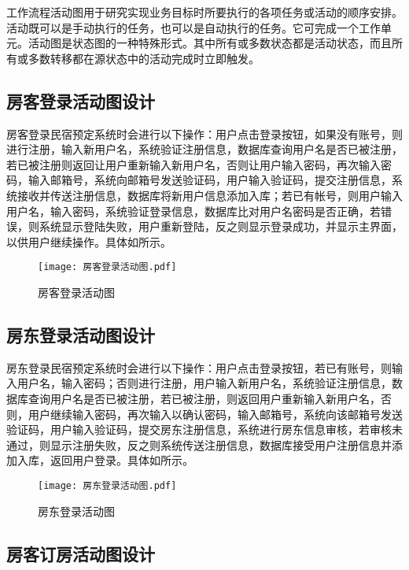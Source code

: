 \documentclass[lang=cn,11pt,a4paper,cite=authoryear]{elegantpaper}
\begin{document}
工作流程活动图用于研究实现业务目标时所要执行的各项任务或活动的顺序安排。活动既可以是手动执行的任务，也可以是自动执行的任务。它可完成一个工作单元。活动图是状态图的一种特殊形式。其中所有或多数状态都是活动状态，而且所有或多数转移都在源状态中的活动完成时立即触发。

\subsection{房客登录活动图设计}

房客登录民宿预定系统时会进行以下操作：用户点击登录按钮，如果没有账号，则进行注册，输入新用户名，系统验证注册信息，数据库查询用户名是否已被注册，若已被注册则返回让用户重新输入新用户名，否则让用户输入密码，再次输入密码，输入邮箱号，系统向邮箱号发送验证码，用户输入验证码，提交注册信息，系统接收并传送注册信息，数据库将新用户信息添加入库；若已有帐号，则用户输入用户名，输入密码，系统验证登录信息，数据库比对用户名密码是否正确，若错误，则系统显示登陆失败，用户重新登陆，反之则显示登录成功，并显示主界面，以供用户继续操作。具体如所示。

\begin{figure}[]
    \centering
    \texttt{[image: 房客登录活动图.pdf]}
    \caption{房客登录活动图}
    \label{fig:房客登录活动图}
\end{figure}

\subsection{房东登录活动图设计}

房东登录民宿预定系统时会进行以下操作：用户点击登录按钮，若已有账号，则输入用户名，输入密码；否则进行注册，用户输入新用户名，系统验证注册信息，数据库查询用户名是否已被注册，若已被注册，则返回用户重新输入新用户名，否则，用户继续输入密码，再次输入以确认密码，输入邮箱号，系统向该邮箱号发送验证码，用户输入验证码，提交房东注册信息，系统进行房东信息审核，若审核未通过，则显示注册失败，反之则系统传送注册信息，数据库接受用户注册信息并添加入库，返回用户登录。具体如所示。

\begin{figure}[]
    \centering
    \texttt{[image: 房东登录活动图.pdf]}
    \caption{房东登录活动图}
    \label{fig:房东登录活动图}
\end{figure}

\subsection{房客订房活动图设计}
\end{document}
